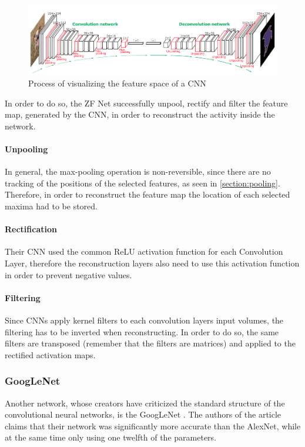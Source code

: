 \begin{figure}[!h]
	\centering
	\includegraphics[scale=0.5]{fig/deconv.png}
	\caption{Process of visualizing the feature space of a CNN \citep{Noh2015}}
	\label{fig:deconv}
\end{figure}

In order to do so, the ZF Net successfully unpool, rectify and filter the feature map, generated by the CNN, in order to reconstruct the activity inside the network. 

\paragraph{Unpooling} In general, the max-pooling operation is non-reversible, since there are no tracking of the positions of the selected features, as seen in \autoref{section:pooling}. Therefore, in order to reconstruct the feature map the location of each selected maxima had to be stored.

\paragraph{Rectification}
Their CNN used the common ReLU activation function for each Convolution Layer, therefore the reconstruction layers also need to use this activation function in order to prevent negative values.

\paragraph{Filtering}
Since CNNs apply kernel filters to each convolution layers input volumes, the filtering has to be inverted when reconstructing. In order to do so, the same filters are transposed (remember that the filters are matrices) and applied to the rectified activation maps.

\subsubsection{GoogLeNet}
Another network, whose creators have criticized the standard structure of the convolutional neural networks, is the GoogLeNet \citep{Szegedy2014}. The authors of the article claims that their network was significantly more accurate than the AlexNet, while at the same time only using one twelfth of the parameters.

